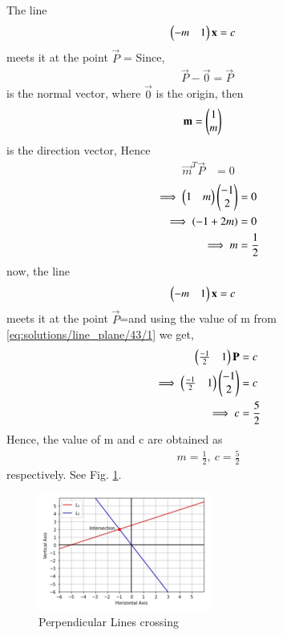The line \begin{align}\begin{pmatrix}-m&1\end{pmatrix}\mathbf{x} &= c \end{align}meets it at the point $\vec{P}$ = Since, \begin{align}
\vec{P}-\vec{0} = \vec{P}\
\end{align} is the normal vector, where $\vec{0}$ is the origin, then 
\begin{align}
\mathbf{m}&=\begin{pmatrix}1\\m\end{pmatrix}\end{align} is the direction vector, Hence
\begin{align}\vec{m}^T\vec{P}&=0
\end{align}
\begin{align}
\implies\begin{pmatrix}1&m\end{pmatrix}\begin{pmatrix}-1\\2\end{pmatrix}&=0\notag
\\\implies(-1+2m) &= 0\notag\\
\implies m&=\frac{1}{2}\label{eq:solutions/line_plane/43/1}
\end{align}
 now, the line
 \begin{align}\begin{pmatrix}-m&1\end{pmatrix}\mathbf{x}&=c\notag\end{align} meets it at the point
 $\vec{P}$=\myvec{-1\\2}\notag and using the value of m from \ref{eq:solutions/line_plane/43/1} we get,
\begin{align} 
\begin{pmatrix}\frac{-1}{2}&1\end{pmatrix}\mathbf{P} &=c\notag\\
\implies\begin{pmatrix}\frac{-1}{2}&1\end{pmatrix}\begin{pmatrix}-1\\2\end{pmatrix} &=c\notag\\
\implies c&=\frac{5}{2}
\end{align}
Hence, the value of m and c are obtained as
\begin{align}
  m=\frac{1}{2} , \  c=\frac{5}{2}\end{align}
  respectively.
See Fig. \ref{fig1:solutions/line_plane/43/}.
\begin{figure}[!ht]
\centering
\includegraphics[width=\columnwidth]{./solutions/line_plane/43/Assignment1 plot.png}
\caption{Perpendicular Lines crossing}
\label{fig1:solutions/line_plane/43/}
\end{figure}  
        
